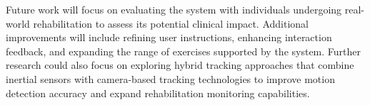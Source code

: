 \documentclass[a4paper,twoside]{article}
\begin{document}
Future work will focus on evaluating the system with individuals undergoing real-world rehabilitation to assess its potential clinical impact. Additional improvements will include refining user instructions, enhancing interaction feedback, and expanding the range of exercises supported by the system.
Further research could also focus on exploring hybrid tracking approaches that combine inertial sensors with camera-based tracking technologies to improve motion detection accuracy and expand rehabilitation monitoring capabilities.





{\small
}
\end{document}
